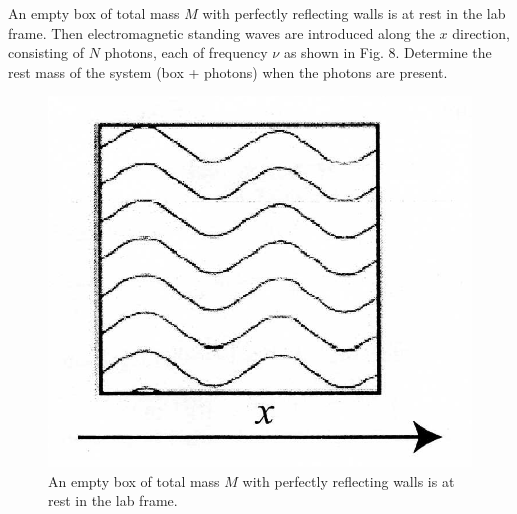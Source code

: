 \begin{problem}
    An empty box of total mass $M$ with perfectly reflecting walls is at rest in the lab frame. Then electromagnetic standing waves are introduced along the $x$ direction, consisting of $N$ photons, each of frequency $\nu$ as shown in Fig. 8. Determine the rest mass of the system (box + photons) when the photons are present.
    \begin{figure}[h]
	    \centering
	    \includegraphics[width=0.5\linewidth]{spho_book_TYS_images/2010q10.png}
	    \caption{An empty box of total mass $M$ with perfectly reflecting walls is at rest in the lab frame.}
    \end{figure}
\end{problem}